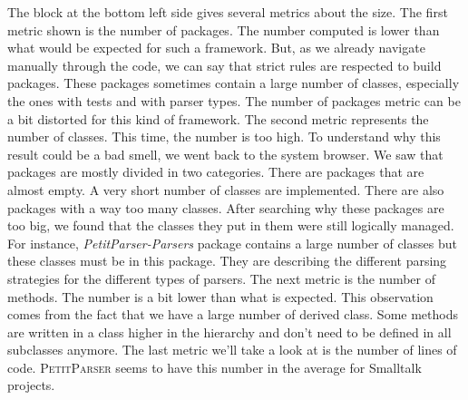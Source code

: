 The block at the bottom left side gives several metrics about the size. The first metric shown is the number of packages. The number computed is lower than what would be expected for such a framework. But, as we already navigate manually through the code, we can say that strict rules are respected to build packages. These packages sometimes contain a large number of classes, especially the ones with tests and with parser types. The number of packages metric can be a bit distorted for this kind of framework. The second metric represents the number of classes. This time, the number is too high. To understand why this result could be a bad smell, we went back to the system browser. We saw that packages are mostly divided in two categories. There are packages that are almost empty. A very short number of classes are implemented. There are also packages with a way too many classes. After searching why these packages are too big, we found that the classes they put in them were still logically managed.  For instance, \textit{PetitParser-Parsers} package contains a large number of classes but these classes must be in this package. They are describing the different parsing strategies for the different types of parsers. The next metric is the number of methods. The number is a bit lower than what is expected. This observation comes from the fact that we have a large number of derived class. Some methods are written in a class higher in the hierarchy and don't need to be defined in all subclasses anymore. The last metric we'll take a look at is the number of lines of code. \textsc{PetitParser} seems to have this number in the average for Smalltalk projects.
